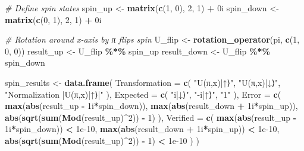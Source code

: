 \documentclass[
]{book}
\newenvironment{Shaded}{\begin{snugshade}}{\end{snugshade}}
\newcommand{\AttributeTok}[1]{\textcolor[rgb]{0.13,0.29,0.53}{#1}}
\newcommand{\CommentTok}[1]{\textcolor[rgb]{0.56,0.35,0.01}{\textit{#1}}}
\newcommand{\DataTypeTok}[1]{\textcolor[rgb]{0.13,0.29,0.53}{#1}}
\newcommand{\DecValTok}[1]{\textcolor[rgb]{0.00,0.00,0.81}{#1}}
\newcommand{\FloatTok}[1]{\textcolor[rgb]{0.00,0.00,0.81}{#1}}
\newcommand{\FunctionTok}[1]{\textcolor[rgb]{0.13,0.29,0.53}{\textbf{#1}}}
\newcommand{\NormalTok}[1]{#1}
\newcommand{\OtherTok}[1]{\textcolor[rgb]{0.56,0.35,0.01}{#1}}
\newcommand{\SpecialCharTok}[1]{\textcolor[rgb]{0.81,0.36,0.00}{\textbf{#1}}}
\newcommand{\StringTok}[1]{\textcolor[rgb]{0.31,0.60,0.02}{#1}}
\theoremstyle{definition}
\theoremstyle{definition}
\theoremstyle{definition}
\theoremstyle{definition}
\theoremstyle{remark}
\begin{document}
\begin{Shaded}
\begin{Highlighting}[]
\CommentTok{\# Define spin states}
\NormalTok{spin\_up }\OtherTok{\textless{}{-}} \FunctionTok{matrix}\NormalTok{(}\FunctionTok{c}\NormalTok{(}\DecValTok{1}\NormalTok{, }\DecValTok{0}\NormalTok{), }\DecValTok{2}\NormalTok{, }\DecValTok{1}\NormalTok{) }\SpecialCharTok{+} \DecValTok{0}\DataTypeTok{i}
\NormalTok{spin\_down }\OtherTok{\textless{}{-}} \FunctionTok{matrix}\NormalTok{(}\FunctionTok{c}\NormalTok{(}\DecValTok{0}\NormalTok{, }\DecValTok{1}\NormalTok{), }\DecValTok{2}\NormalTok{, }\DecValTok{1}\NormalTok{) }\SpecialCharTok{+} \DecValTok{0}\DataTypeTok{i}

\CommentTok{\# Rotation around x{-}axis by π flips spin}
\NormalTok{U\_flip }\OtherTok{\textless{}{-}} \FunctionTok{rotation\_operator}\NormalTok{(pi, }\FunctionTok{c}\NormalTok{(}\DecValTok{1}\NormalTok{, }\DecValTok{0}\NormalTok{, }\DecValTok{0}\NormalTok{))}
\NormalTok{result\_up }\OtherTok{\textless{}{-}}\NormalTok{ U\_flip }\SpecialCharTok{\%*\%}\NormalTok{ spin\_up}
\NormalTok{result\_down }\OtherTok{\textless{}{-}}\NormalTok{ U\_flip }\SpecialCharTok{\%*\%}\NormalTok{ spin\_down}

\NormalTok{spin\_results }\OtherTok{\textless{}{-}} \FunctionTok{data.frame}\NormalTok{(}
  \AttributeTok{Transformation =} \FunctionTok{c}\NormalTok{(}
    \StringTok{"U(π,x)|↑⟩"}\NormalTok{,}
    \StringTok{"U(π,x)|↓⟩"}\NormalTok{,}
    \StringTok{"Normalization |U(π,x)|↑⟩|"}
\NormalTok{  ),}
  \AttributeTok{Expected =} \FunctionTok{c}\NormalTok{(}
    \StringTok{"i|↓⟩"}\NormalTok{,}
    \StringTok{"{-}i|↑⟩"}\NormalTok{,}
    \StringTok{"1"}
\NormalTok{  ),}
  \AttributeTok{Error =} \FunctionTok{c}\NormalTok{(}
    \FunctionTok{max}\NormalTok{(}\FunctionTok{abs}\NormalTok{(result\_up }\SpecialCharTok{{-}} \DecValTok{1}\DataTypeTok{i}\SpecialCharTok{*}\NormalTok{spin\_down)),}
    \FunctionTok{max}\NormalTok{(}\FunctionTok{abs}\NormalTok{(result\_down }\SpecialCharTok{+} \DecValTok{1}\DataTypeTok{i}\SpecialCharTok{*}\NormalTok{spin\_up)),}
    \FunctionTok{abs}\NormalTok{(}\FunctionTok{sqrt}\NormalTok{(}\FunctionTok{sum}\NormalTok{(}\FunctionTok{Mod}\NormalTok{(result\_up)}\SpecialCharTok{\^{}}\DecValTok{2}\NormalTok{)) }\SpecialCharTok{{-}} \DecValTok{1}\NormalTok{)}
\NormalTok{  ),}
  \AttributeTok{Verified =} \FunctionTok{c}\NormalTok{(}
    \FunctionTok{max}\NormalTok{(}\FunctionTok{abs}\NormalTok{(result\_up }\SpecialCharTok{{-}} \DecValTok{1}\DataTypeTok{i}\SpecialCharTok{*}\NormalTok{spin\_down)) }\SpecialCharTok{\textless{}} \FloatTok{1e{-}10}\NormalTok{,}
    \FunctionTok{max}\NormalTok{(}\FunctionTok{abs}\NormalTok{(result\_down }\SpecialCharTok{+} \DecValTok{1}\DataTypeTok{i}\SpecialCharTok{*}\NormalTok{spin\_up)) }\SpecialCharTok{\textless{}} \FloatTok{1e{-}10}\NormalTok{,}
    \FunctionTok{abs}\NormalTok{(}\FunctionTok{sqrt}\NormalTok{(}\FunctionTok{sum}\NormalTok{(}\FunctionTok{Mod}\NormalTok{(result\_up)}\SpecialCharTok{\^{}}\DecValTok{2}\NormalTok{)) }\SpecialCharTok{{-}} \DecValTok{1}\NormalTok{) }\SpecialCharTok{\textless{}} \FloatTok{1e{-}10}
\NormalTok{  )}
\NormalTok{)}


\end{Highlighting}
\end{Shaded}
\end{document}
